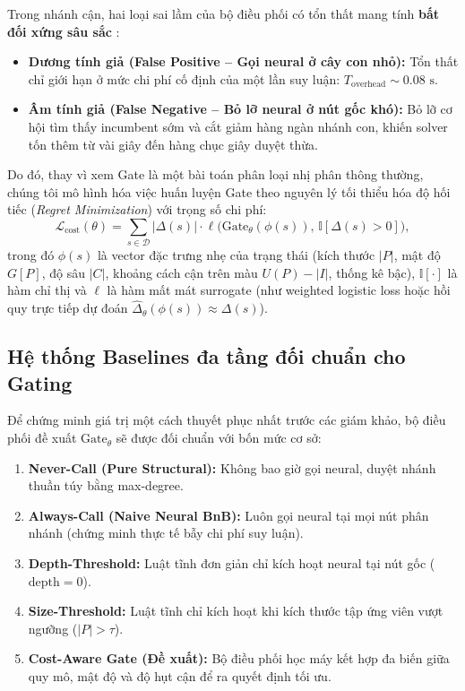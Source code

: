 \documentclass[11pt,a4paper]{article}
\begin{document}
Trong nhánh cận, hai loại sai lầm của bộ điều phối có tổn thất mang tính \textbf{bất đối xứng sâu sắc} \citep{elkan2001}:
\begin{itemize}[leftmargin=*]
    \item \textbf{Dương tính giả (False Positive -- Gọi neural ở cây con nhỏ):} Tổn thất chỉ giới hạn ở mức chi phí cố định của một lần suy luận: $T_{\mathrm{overhead}} \sim 0.08\text{ s}$.
    \item \textbf{Âm tính giả (False Negative -- Bỏ lỡ neural ở nút gốc khó):} Bỏ lỡ cơ hội tìm thấy incumbent sớm và cắt giảm hàng ngàn nhánh con, khiến solver tốn thêm từ vài giây đến hàng chục giây duyệt thừa.
\end{itemize}
Do đó, thay vì xem Gate là một bài toán phân loại nhị phân thông thường, chúng tôi mô hình hóa việc huấn luyện Gate theo nguyên lý tối thiểu hóa độ hối tiếc (\textit{Regret Minimization}) với trọng số chi phí:
\begin{equation}
\mathcal{L}_{\mathrm{cost}}(\theta) = \sum_{s \in \mathcal{D}} |\Delta(s)| \cdot \ell\big(\text{Gate}_\theta(\phi(s)),\, \mathbb{I}[\Delta(s) > 0]\big),
\end{equation}
trong đó $\phi(s)$ là vector đặc trưng nhẹ của trạng thái (kích thước $|P|$, mật độ $G[P]$, độ sâu $|C|$, khoảng cách cận trên màu $U(P) - |I|$, thống kê bậc), $\mathbb{I}[\cdot]$ là hàm chỉ thị và $\ell$ là hàm mất mát surrogate (như weighted logistic loss hoặc hồi quy trực tiếp dự đoán $\widehat{\Delta}_\theta(\phi(s)) \approx \Delta(s)$).

\subsection{Hệ thống Baselines đa tầng đối chuẩn cho Gating}
Để chứng minh giá trị một cách thuyết phục nhất trước các giám khảo, bộ điều phối đề xuất $\text{Gate}_\theta$ sẽ được đối chuẩn với bốn mức cơ sở:
\begin{enumerate}[leftmargin=*]
    \item \textbf{Never-Call (Pure Structural):} Không bao giờ gọi neural, duyệt nhánh thuần túy bằng max-degree.
    \item \textbf{Always-Call (Naive Neural BnB):} Luôn gọi neural tại mọi nút phân nhánh (chứng minh thực tế bẫy chi phí suy luận).
    \item \textbf{Depth-Threshold:} Luật tĩnh đơn giản chỉ kích hoạt neural tại nút gốc ($\text{depth} = 0$).
    \item \textbf{Size-Threshold:} Luật tĩnh chỉ kích hoạt khi kích thước tập ứng viên vượt ngưỡng ($|P| > \tau$).
    \item \textbf{Cost-Aware Gate (Đề xuất):} Bộ điều phối học máy kết hợp đa biến giữa quy mô, mật độ và độ hụt cận để ra quyết định tối ưu.
\end{enumerate}
\end{document}
